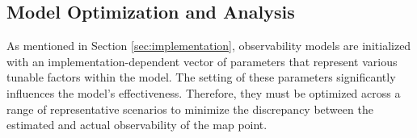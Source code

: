 \subsection{Model Optimization and Analysis}

As mentioned in Section \ref{sec:implementation}, observability models are initialized with an implementation-dependent vector of parameters that represent various tunable factors within the model. The setting of these parameters significantly influences the model's effectiveness. Therefore, they must be optimized across a range of representative scenarios to minimize the discrepancy between the estimated and actual observability of the map point. 

\subsubsection{}